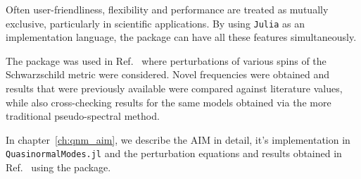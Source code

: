 Often user-friendliness, flexibility and performance are treated as mutually exclusive, particularly in scientific applications. By using \texttt{Julia} as an implementation language, the package can have all these features simultaneously.

The package was used in Ref.~\cite{Mamani2022} where perturbations of various spins of the Schwarzschild metric were considered. Novel frequencies were obtained and results that were previously available were compared against literature values, while also cross-checking results for the same models obtained via the more traditional pseudo-spectral method.

In chapter~\ref{ch:qnm_aim}, we describe the \ac{AIM} in detail, it's implementation in \texttt{QuasinormalModes.jl} and the perturbation equations and results obtained in Ref.~\cite{Mamani2022} using the package.